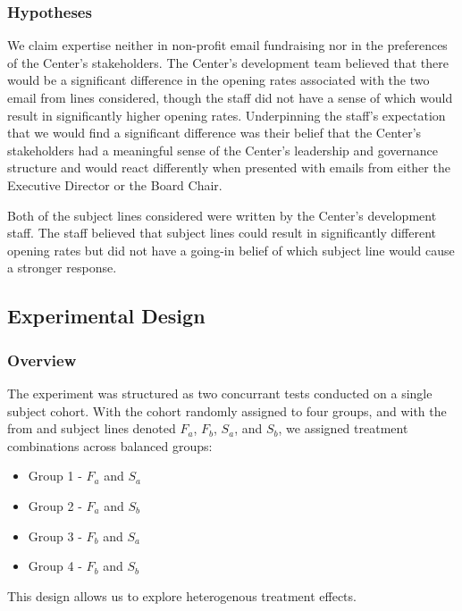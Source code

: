 \documentclass[]{article}
\providecommand{\tightlist}{%
  \setlength{\itemsep}{0pt}\setlength{\parskip}{0pt}}
\begin{document}
\subsubsection{Hypotheses}\label{hypotheses}

We claim expertise neither in non-profit email fundraising nor in the
preferences of the Center's stakeholders. The Center's development team
believed that there would be a significant difference in the opening
rates associated with the two email from lines considered, though the
staff did not have a sense of which would result in significantly higher
opening rates. Underpinning the staff's expectation that we would find a
significant difference was their belief that the Center's stakeholders
had a meaningful sense of the Center's leadership and governance
structure and would react differently when presented with emails from
either the Executive Director or the Board Chair.

Both of the subject lines considered were written by the Center's
development staff. The staff believed that subject lines could result in
significantly different opening rates but did not have a going-in belief
of which subject line would cause a stronger response.

\subsection{Experimental Design}\label{experimental-design}

\subsubsection{Overview}\label{overview}

The experiment was structured as two concurrant tests conducted on a
single subject cohort. With the cohort randomly assigned to four groups,
and with the from and subject lines denoted \(F_a\), \(F_b\), \(S_a\),
and \(S_b\), we assigned treatment combinations across balanced groups:

\begin{itemize}
\tightlist
\item
  Group 1 - \(F_a\) and \(S_a\)
\item
  Group 2 - \(F_a\) and \(S_b\)
\item
  Group 3 - \(F_b\) and \(S_a\)
\item
  Group 4 - \(F_b\) and \(S_b\)
\end{itemize}

This design allows us to explore heterogenous treatment effects.
\end{document}
